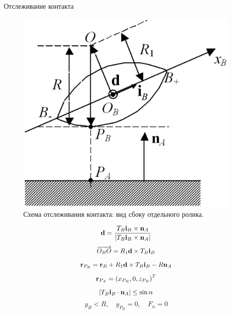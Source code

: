 \begin{frame}{Отслеживание контакта}
        \begin{figure}[htb]
            \centering\includegraphics[width=\textwidth]{content/parts/3_friction/nd/RollerSection_d_ib.png}
            \caption{Схема отслеживания контакта: вид сбоку отдельного ролика.}
            \label{ContactScheme}
        \end{figure}
    \endminipage
        $$ {\bf d}=\dfrac{T_B{\bf i}_B\times {\bf n}_A}{\left| T_B{\bf i}_B\times {\bf n}_A\right|} $$
        $$ \overrightarrow{O_BO}=R_1{\bf d}\times T_B{\bf i}_B $$
        $$ {\bf r}_{P_B}={\bf r}_B+R_1{\bf d}\times T_B{\bf i}_B-R{\bf n}_A $$
        $$ {\bf r}_{P_A}=\left( x_{P_B},0,z_{P_B}\right) ^T $$
        $$ \left| T_B{\bf i}_B\cdot {\bf n}_A\right|\le\sin\alpha $$
        $$ y_B<R, \quad y_{P_B}=0, \quad F_n=0 $$
    \endminipage
\end{frame}

